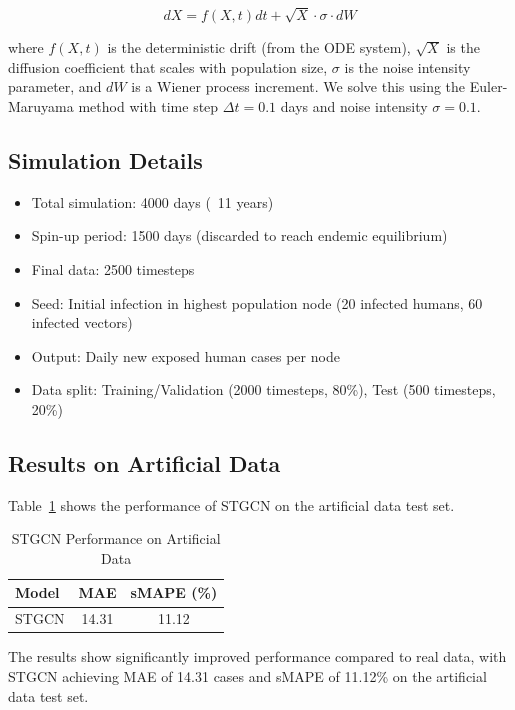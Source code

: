 \documentclass[12pt,a4paper]{article}
\begin{document}
\begin{equation}
dX = f(X, t) dt + \sqrt{X} \cdot \sigma \cdot dW
\end{equation}

where $f(X, t)$ is the deterministic drift (from the ODE system), $\sqrt{X}$ is the diffusion coefficient that scales with population size, $\sigma$ is the noise intensity parameter, and $dW$ is a Wiener process increment. We solve this using the Euler-Maruyama method with time step $\Delta t = 0.1$ days and noise intensity $\sigma = 0.1$.

\subsection{Simulation Details}
\begin{itemize}
    \item Total simulation: 4000 days (~11 years)
    \item Spin-up period: 1500 days (discarded to reach endemic equilibrium)
    \item Final data: 2500 timesteps
    \item Seed: Initial infection in highest population node (20 infected humans, 60 infected vectors)
    \item Output: Daily new exposed human cases per node
    \item Data split: Training/Validation (2000 timesteps, 80\%), Test (500 timesteps, 20\%)
\end{itemize}

\subsection{Results on Artificial Data}

Table~\ref{tab:artificial_data_results} shows the performance of STGCN on the artificial data test set.

\begin{table}[H]
\centering
\caption{STGCN Performance on Artificial Data}
\label{tab:artificial_data_results}
\begin{tabular}{|l|c|c|}
\hline
\textbf{Model} & \textbf{MAE} & \textbf{sMAPE (\%)} \\
\hline
STGCN & 14.31 & 11.12 \\
\hline
\end{tabular}
\end{table}

The results show significantly improved performance compared to real data, with STGCN achieving MAE of 14.31 cases and sMAPE of 11.12\% on the artificial data test set.
\end{document}
